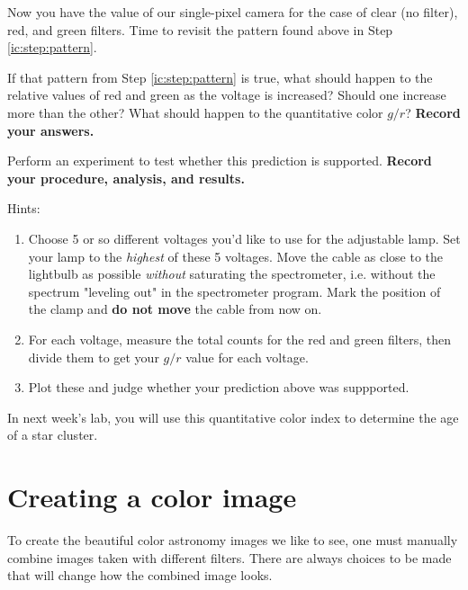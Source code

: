 Now you have the value of our single-pixel camera for the case of clear (no filter), red, and green filters. Time to revisit the pattern found above in Step \ref{ic:step:pattern}.

\begin{steps}
	\item\label{ic:it:test1} If that pattern from Step \ref{ic:step:pattern} is true, what should happen to the relative values of red and green as the voltage is increased? Should one increase more than the other? What should happen to the quantitative color $g/r$? \textbf{Record your answers.}
	
	\item\label{ic:it:test2} Perform an experiment to test whether this prediction is supported. \textbf{Record your procedure, analysis, and results.}
	
	Hints:
	
	\begin{enumerate}
		\item Choose 5 or so different voltages you'd like to use for the adjustable lamp.
		Set your lamp to the \emph{highest} of these 5 voltages. Move the cable as close to the lightbulb as possible
		\emph{without} saturating the spectrometer, i.e. without the spectrum "leveling
		out" in the spectrometer program. Mark the position of the clamp and \textbf{do
			not move} the cable from now on.
		
		\item For each voltage, measure the total counts for the red and green filters, then divide them to get your $g/r$ value for each voltage.
		
		\item Plot these and judge whether your prediction above was suppported.
	\end{enumerate}
\end{steps}

In next week's lab, you will use this quantitative color index to determine the age of a star cluster.

\section{Creating a color image}\label{ic:sec:image}

To create the beautiful color astronomy images we like to see, one must manually combine images taken with different filters. There are always choices to be made that will change how the combined image looks.

